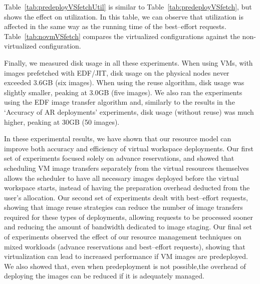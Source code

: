 Table~\ref{tab:predeployVSfetchUtil} is similar to Table~\ref{tab:predeployVSfetch}, but shows the effect on utilization. In this table, we can observe that utilization is affected in the same way as the running time of the best--effort requests. Table~\ref{tab:novmVSfetch} compares the virtualized configurations against the non-virtualized configuration.

Finally, we measured disk usage in all these experiments. When using VMs, with images prefetched with EDF/JIT, disk usage on the physical nodes never exceeded 3.6GB (six images). When using the reuse algorithm, disk usage was slightly smaller, peaking at 3.0GB (five images). We also ran the experiments using the EDF image transfer algorithm and, similarly to the results in the `Accuracy of AR deployments' experiments, disk usage (without reuse) was much higher, peaking at 30GB (50 images).

\vspace{4ex}

In these experimental results, we have shown that our resource model can improve both accuracy and efficiency of virtual workspace deployments. Our first set of experiments focused solely on advance reservations, and showed that scheduling VM image transfers separately from the virtual resources themselves allows the scheduler to have all necessary images deployed before the virtual workspace starts, instead of having the preparation overhead deducted from the user's allocation. Our second set of experiments dealt with best--effort requests, showing that image reuse strategies can reduce the number of image transfers required for these types of deployments, allowing requests to be processed sooner and reducing the amount of bandwidth dedicated to image staging. Our final set of experiments observed the effect of our resource management techniques on mixed workloads (advance reservations and best--effort requests), showing that virtualization can lead to increased performance if VM images are predeployed. We also showed that, even when predeployment is not possible,the overhead of deploying the images can be reduced if it is adequately managed.


